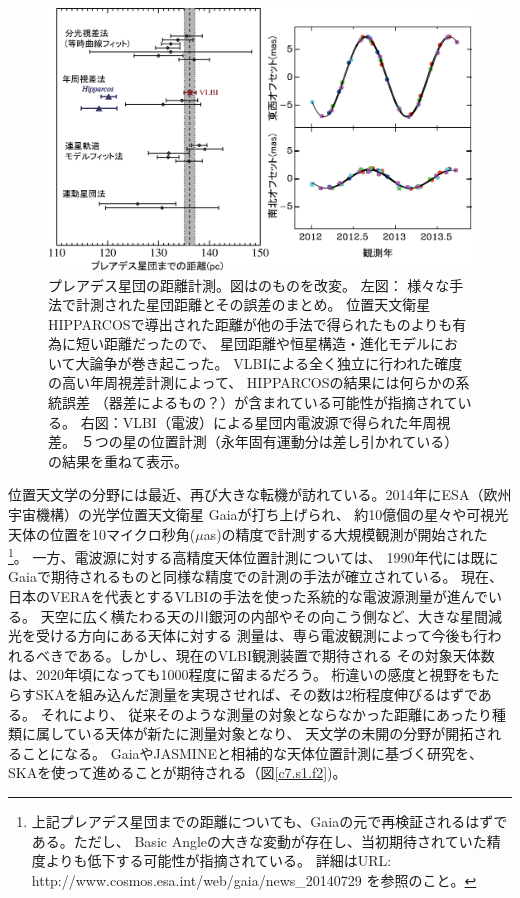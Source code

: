 \begin{figure}[th]
\begin{center}
\includegraphics[width=0.9\linewidth]{astrometry/Pleiades_distance_2014.eps}
\end{center}
\vspace{-7mm}
\caption{プレアデス星団の距離計測。図は\citet{2014Sci...345.1029M}のものを改変。
左図： 様々な手法で計測された星団距離とその誤差のまとめ。
位置天文衛星HIPPARCOSで導出された距離が他の手法で得られたものよりも有為に短い距離だったので、
星団距離や恒星構造・進化モデルにおいて大論争が巻き起こった。
VLBIによる全く独立に行われた確度の高い年周視差計測によって、
HIPPARCOSの結果には何らかの系統誤差
（器差によるもの？）が含まれている可能性が指摘されている。
右図：VLBI（電波）による星団内電波源で得られた年周視差。
５つの星の位置計測（永年固有運動分は差し引かれている）の結果を重ねて表示。}\label{c7.s1.f1}
\end{figure}

位置天文学の分野には最近、再び大きな転機が訪れている。2014年にESA（欧州宇宙機構）の光学位置天文衛星
Gaiaが打ち上げられ、
約10億個の星々や可視光天体の位置を10マイクロ秒角($\mu$as)の精度で計測する大規模観測が開始された
\footnote
{上記プレアデス星団までの距離についても、Gaiaの元で再検証されるはずである。ただし、
Basic Angleの大きな変動が存在し、当初期待されていた精度よりも低下する可能性が指摘されている。
詳細はURL: http://www.cosmos.esa.int/web/gaia/news\_20140729 を参照のこと。}。
一方、電波源に対する高精度天体位置計測については、
1990年代には既にGaiaで期待されるものと同様な精度での計測の手法が確立されている。
現在、日本のVERAを代表とするVLBIの手法を使った系統的な電波源測量が進んでいる。
天空に広く横たわる天の川銀河の内部やその向こう側など、大きな星間減光を受ける方向にある天体に対する
測量は、専ら電波観測によって今後も行われるべきである。しかし、現在のVLBI観測装置で期待される
その対象天体数は、2020年頃になっても1000程度に留まるだろう。
桁違いの感度と視野をもたらすSKAを組み込んだ測量を実現させれば、その数は2桁程度伸びるはずである。
それにより、
従来そのような測量の対象とならなかった距離にあったり種類に属している天体が新たに測量対象となり、
天文学の未開の分野が開拓されることになる。
GaiaやJASMINEと相補的な天体位置計測に基づく研究を、
SKAを使って進めることが期待される（図\ref{c7.s1.f2})。

